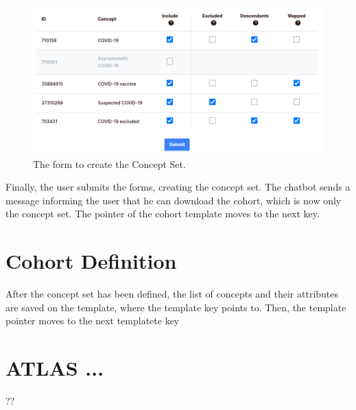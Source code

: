 \begin{figure}[H]
  \includegraphics[width=1\textwidth]{figs/chapter4/form.png}
  \centering
  \caption{The form to create the Concept Set.}
  \label{fig_forms}
\end{figure}

Finally, the user submits the forms, creating the concept set. The chatbot sends a message informing the user that he can download the cohort, which is now only the concept set. The pointer of the cohort template moves to the next key.



\section{Cohort Definition}


After the concept set has been defined, the list of concepts and their attributes are saved on the template, where the template key points to. Then, the template pointer moves to the next templatete key

\section{ATLAS ...}

??


